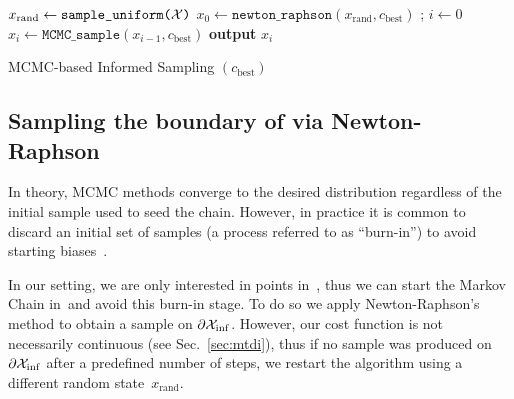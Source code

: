 \documentclass[letterpaper, 10 pt, conference]{ieeeconf}  %
\begin{document}
\begin{algorithm}[t]
	\begin{algorithmic}[1]
		\LOOP
			\STATE $x_{\text{rand}} \leftarrow \texttt{sample\_uniform(\ensuremath{\mathcal{X}})}$
			\STATE $x_{0} 
		 \leftarrow
		 \texttt{newton\_raphson}(x_{\text{rand}}, c_{\text{best}})$ ; \hspace{3mm} $i\leftarrow 0$
			\STATE $x_{i} \leftarrow \texttt{MCMC\_sample} (x_{i-1}, c_{\text{best}})$
			\STATE \textbf{output} $x_{i}$
			\ENDWHILE
	
		\ENDLOOP 
%		 
   	\end{algorithmic}
	\caption{MCMC-based Informed Sampling $(c_{\text{best}})$}
	\label{alg:mcmc_informed_sampling}	
\end{algorithm}

\subsection{Sampling the boundary of \Cinf via Newton-Raphson}
\label{subsec:grad}
In theory, MCMC methods converge to the desired distribution regardless of the initial sample used to seed the chain.
However, in practice it is common to discard an initial set of samples (a process referred to as ``burn-in'') to avoid starting biases~\cite{ADDJ03}. 

In our setting, we are only interested in points in~\Cinf, thus we can start the Markov Chain in~\Cinf and avoid this burn-in stage. 
To do so we apply  Newton-Raphson's method to obtain a sample on $\partial \mathcal{X}_{\rm {inf}}$. 
However, our cost function is not necessarily continuous (see Sec.~\ref{sec:mtdi}), thus if no sample was produced on $\partial \mathcal{X}_{\rm {inf}}$ after a predefined number of steps, we restart the algorithm using a different random state~$x_\text{rand}$.
\end{document}
